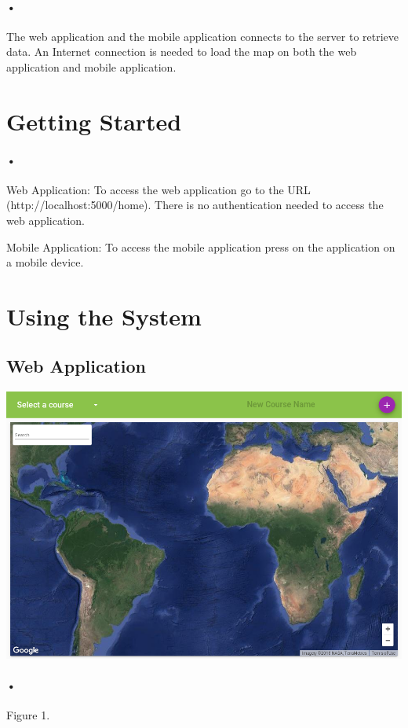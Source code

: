 \documentclass{article}
\begin{document}
	\paragraph{•}
	  The web application and the mobile application connects to the server to retrieve data. An Internet connection is needed to load the map on both the web application and mobile application.
	
	\section{Getting Started}
	\paragraph{•}
	
	Web Application: To access the web application go to the URL (http://localhost:5000/home). There is no authentication needed to access the web application.
	
	Mobile Application: To access the mobile application press on the application on a mobile device.
	\section{Using the System}
    \subsection{Web Application}
    \includegraphics[scale=0.25]{map}
    \paragraph{•}
    Figure 1.
    
\end{document}
